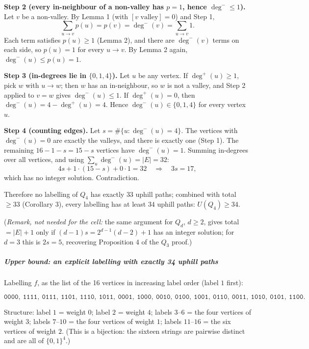 \textbf{Step 2 (every in-neighbour of a non-valley has \(p=1\), hence
\(\deg^-\le1\)).} Let \(v\) be a non-valley. By Lemma 1 (with
\([v\text{ valley}]=0\)) and Step 1,
\[\sum_{u\to v}p(u)=p(v)=\deg^-(v)=\sum_{u\to v}1 .\] Each term
satisfies \(p(u)\ge1\) (Lemma 2), and there are \(\deg^-(v)\) terms on
each side, so \(p(u)=1\) for every \(u\to v\). By Lemma 2 again,
\(\deg^-(u)\le p(u)=1\).

\textbf{Step 3 (in-degrees lie in \(\{0,1,4\}\)).} Let \(u\) be any
vertex. If \(\deg^+(u)\ge1\), pick \(w\) with \(u\to w\); then \(w\) has
an in-neighbour, so \(w\) is not a valley, and Step 2 applied to \(v=w\)
gives \(\deg^-(u)\le1\). If \(\deg^+(u)=0\), then
\(\deg^-(u)=4-\deg^+(u)=4\). Hence \(\deg^-(u)\in\{0,1,4\}\) for every
vertex \(u\).

\textbf{Step 4 (counting edges).} Let \(s=\#\{u:\deg^-(u)=4\}\). The
vertices with \(\deg^-(u)=0\) are exactly the valleys, and there is
exactly one (Step 1). The remaining \(16-1-s=15-s\) vertices have
\(\deg^-(u)=1\). Summing in-degrees over all vertices, and using
\(\sum_u\deg^-(u)=|E|=32\):
\[4s+1\cdot(15-s)+0\cdot 1=32\quad\Longrightarrow\quad 3s=17,\] which
has no integer solution. Contradiction.

Therefore no labelling of \(Q_4\) has exactly \(33\) uphill paths;
combined with total \(\ge33\) (Corollary 3), every labelling has at
least \(34\) uphill paths: \(U(Q_4)\ge34\).

(\emph{Remark, not needed for the cell:} the same argument for \(Q_d\),
\(d\ge2\), gives total \(=|E|+1\) only if \((d-1)s=2^{d-1}(d-2)+1\) has
an integer solution; for \(d=3\) this is \(2s=5\), recovering
Proposition 4 of the \(Q_3\) proof.)

\subparagraph{Upper bound: an explicit labelling with exactly 34 uphill
paths}\label{upper-bound-an-explicit-labelling-with-exactly-34-uphill-paths}

Labelling \(f\), as the list of the 16 vertices in increasing label
order (label \(1\) first):

\[\texttt{0000},\ \texttt{1111},\ \texttt{0111},\ \texttt{1101},\ \texttt{1110},\ \texttt{1011},\ \texttt{0001},\ \texttt{1000},\ \texttt{0010},\ \texttt{0100},\ \texttt{1001},\ \texttt{0110},\ \texttt{0011},\ \texttt{1010},\ \texttt{0101},\ \texttt{1100}.\]

Structure: label \(1\) = weight \(0\); label \(2\) = weight \(4\);
labels \(3\)--\(6\) = the four vertices of weight \(3\); labels
\(7\)--\(10\) = the four vertices of weight \(1\); labels \(11\)--\(16\)
= the six vertices of weight \(2\). (This is a bijection: the sixteen
strings are pairwise distinct and are all of \(\{0,1\}^4\).)

